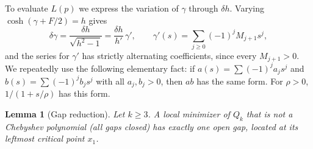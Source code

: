 \documentclass[11pt]{article}
\newtheorem{lemma}[theorem]{Lemma}
\theoremstyle{remark}
\begin{document}
To evaluate $L(p)$ we express the variation of $\gamma$ through $\delta h$.
Varying $\cosh(\gamma+F/2)=h$ gives
\[
\delta\gamma=\frac{\delta h}{\sqrt{h^2-1}}=\frac{\delta h}{h'}\,\gamma',
\qquad \gamma'(s)=\sum_{j\ge0}(-1)^jM_{j+1}s^j,
\]
and the series for $\gamma'$ has strictly alternating coefficients, since
every $M_{j+1}>0$. We repeatedly use the following elementary fact: if
$a(s)=\sum(-1)^ja_js^j$ and $b(s)=\sum(-1)^jb_js^j$ with all $a_j,b_j>0$,
then $ab$ has the same form. For $\rho>0$, $1/(1+s/\rho)$ has this form.

\begin{lemma}[Gap reduction]\label{lem:gap}
Let $k\ge3$. A local minimizer of $Q_k$ that is not a Chebyshev polynomial
(all gaps closed) has exactly one open gap, located at its leftmost
critical point $x_1$.
\end{lemma}
\end{document}
